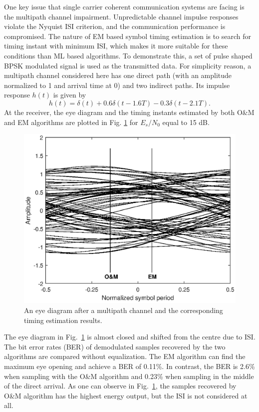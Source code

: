\documentclass[journal,comsoc]{IEEEtran}
\begin{document}
One key issue that single carrier coherent communication systems are facing is the multipath channel impairment.
Unpredictable channel impulse responses violate the Nyquist ISI criterion, and the communication performance is compromised.
The nature of EM based symbol timing estimation is to search for timing instant with minimum ISI, which makes it more suitable for these conditions than ML based algorithms.
To demonstrate this, a set of pulse shaped BPSK modulated signal is used as the transmitted data.
For simplicity reason, a multipath channel considered here has one direct path (with an amplitude normalized to 1 and arrival time at 0) and two indirect paths.
Its impulse response $h(t)$ is given by
\begin{equation}
h(t)=\delta(t)+0.6\delta(t-1.6T)-0.3\delta(t-2.1T).
\label{eq:multi_path}
\end{equation}
At the receiver, the eye diagram and the timing instants estimated by both O\&M and EM algorithms are plotted in Fig. \ref{fig:per_timing_isi} for \(E_s/N_0\) equal to 15 dB. 
\begin{figure}[ht]
\centering
\includegraphics[width=3 in]{pic/per_timing_multi-k.eps}
\caption{An eye diagram after a multipath channel and the corresponding timing estimation results.}
\label{fig:per_timing_isi} 
\end{figure} 

The eye diagram in Fig.~\ref{fig:per_timing_isi} is almost closed and shifted from the centre due to ISI.
The bit error rates (BER) of demodulated samples recovered by the two algorithms are compared without equalization.
The EM algorithm can find the maximum eye opening and achieve a BER of 0.11\%.
In contrast, the BER is 2.6\% when sampling with the O\&M algorithm and 0.23\% when sampling in the middle of the direct arrival.
As one can observe in Fig.~\ref{fig:per_timing_isi}, the samples recovered by O\&M algorithm has the highest energy output, but the ISI is not considered at all.
\end{document}

